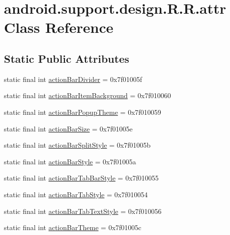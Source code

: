 \hypertarget{classandroid_1_1support_1_1design_1_1_r_1_1attr}{
\section{android.support.design.R.R.attr Class Reference}
\label{classandroid_1_1support_1_1design_1_1_r_1_1attr}
}
\subsection*{Static Public Attributes}
\begin{CompactItemize}
\item 
static final int \hyperlink{classandroid_1_1support_1_1design_1_1_r_1_1attr_a9388f5230e37829f52c8e610a89612f}{actionBarDivider} = 0x7f01005f
\item 
static final int \hyperlink{classandroid_1_1support_1_1design_1_1_r_1_1attr_4bf92863f3d9d3a9d37794e874b771bd}{actionBarItemBackground} = 0x7f010060
\item 
static final int \hyperlink{classandroid_1_1support_1_1design_1_1_r_1_1attr_97afefd60d393fb0fb2f5f019514bccf}{actionBarPopupTheme} = 0x7f010059
\item 
static final int \hyperlink{classandroid_1_1support_1_1design_1_1_r_1_1attr_17b890be0f14b02e23be641cb07a3345}{actionBarSize} = 0x7f01005e
\item 
static final int \hyperlink{classandroid_1_1support_1_1design_1_1_r_1_1attr_62ac575e54df19b6639d84a2226bc971}{actionBarSplitStyle} = 0x7f01005b
\item 
static final int \hyperlink{classandroid_1_1support_1_1design_1_1_r_1_1attr_178542b26e1ac0e87c99518e83658c9a}{actionBarStyle} = 0x7f01005a
\item 
static final int \hyperlink{classandroid_1_1support_1_1design_1_1_r_1_1attr_b0421973a579a5d8cbde1a6e8b8b686b}{actionBarTabBarStyle} = 0x7f010055
\item 
static final int \hyperlink{classandroid_1_1support_1_1design_1_1_r_1_1attr_3371214b6099b3ec8242211aa1b02712}{actionBarTabStyle} = 0x7f010054
\item 
static final int \hyperlink{classandroid_1_1support_1_1design_1_1_r_1_1attr_5aeecdc226c3f592819d7da075aad909}{actionBarTabTextStyle} = 0x7f010056
\item 
static final int \hyperlink{classandroid_1_1support_1_1design_1_1_r_1_1attr_74d6cfb7e59a58fc583d75d47e4849f6}{actionBarTheme} = 0x7f01005c
\item 

\end{CompactItemize}
